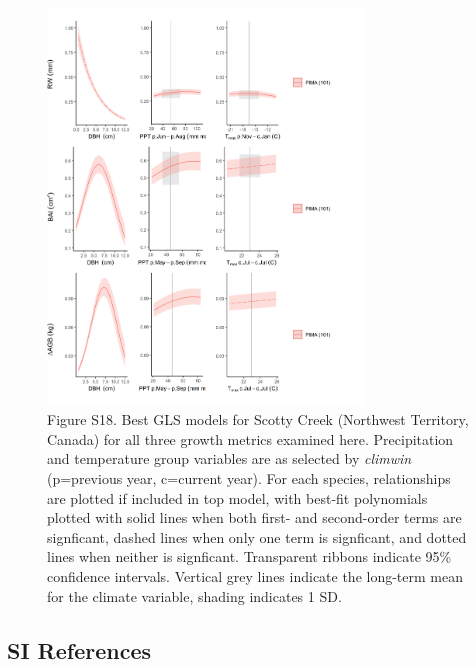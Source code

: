 \documentclass[
]{article}
\begin{document}
\begin{figure}
\centering
\includegraphics[width=0.75\textwidth,height=\textheight]{tables_figures/SI_figures/composite_plots/ScottyCreek.png}
\caption{Figure S18. Best GLS models for Scotty Creek (Northwest
Territory, Canada) for all three growth metrics examined here.
Precipitation and temperature group variables are as selected by
\emph{climwin} (p=previous year, c=current year). For each species,
relationships are plotted if included in top model, with best-fit
polynomials plotted with solid lines when both first- and second-order
terms are signficant, dashed lines when only one term is signficant, and
dotted lines when neither is signficant. Transparent ribbons indicate
95\% confidence intervals. Vertical grey lines indicate the long-term
mean for the climate variable, shading indicates 1 SD.}
\end{figure}

\newpage

\hypertarget{si-references}{%
\subsection*{SI References}\label{si-references}}
\end{document}
